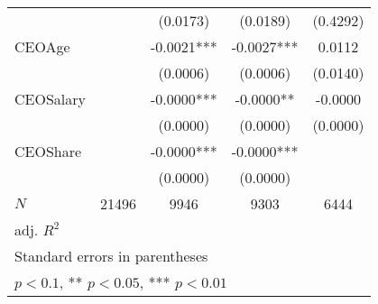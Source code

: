 \begin{table}[htbp]
\begin{tabular}{l*{4}{c}}
            &               &    (0.0173)   &    (0.0189)   &    (0.4292)   \\
[1em]
CEOAge      &               &     -0.0021***&     -0.0027***&      0.0112   \\
            &               &    (0.0006)   &    (0.0006)   &    (0.0140)   \\
[1em]
CEOSalary   &               &     -0.0000***&     -0.0000** &     -0.0000   \\
            &               &    (0.0000)   &    (0.0000)   &    (0.0000)   \\
[1em]
CEOShare    &               &     -0.0000***&     -0.0000***&               \\
            &               &    (0.0000)   &    (0.0000)   &               \\
\hline
\(N\)       &       21496   &        9946   &        9303   &        6444   \\
adj. \(R^{2}\)&               &               &               &               \\
\hline\hline
\multicolumn{5}{l}{\footnotesize Standard errors in parentheses}\\
\multicolumn{5}{l}{\footnotesize * \(p<0.1\), ** \(p<0.05\), *** \(p<0.01\)}\\
\end{tabular}
\end{table}
